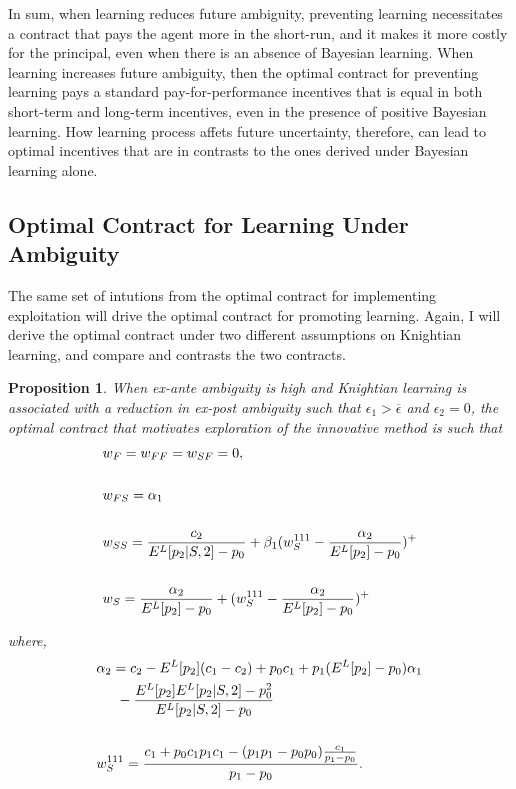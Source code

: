 \documentclass[11pt]{article} %
\theoremstyle{exampstyle}
\newtheorem{proposition}{Proposition}
\newcommand{\eq}[1]{\begin{align}#1\end{align}}
\begin{document}
In sum, when learning reduces future ambiguity, preventing learning necessitates a contract that pays the agent more in the short-run, and it makes it more costly for the principal, even when there is an absence of Bayesian learning. When learning increases future ambiguity, then the optimal contract for preventing learning pays a standard pay-for-performance incentives that is equal in both short-term and long-term incentives, even in the presence of positive Bayesian learning. How learning process affets future uncertainty, therefore, can lead to optimal incentives that are in contrasts to the ones derived under Bayesian learning alone. 


\subsection{Optimal Contract for Learning Under Ambiguity}

The same set of intutions from the optimal contract for implementing exploitation will drive the optimal contract for promoting learning. Again, I will derive the optimal contract under two different assumptions on Knightian learning, and compare and contrasts the two contracts. 

\vspace{.1in}
\begin{proposition}
\label{exploration}
When ex-ante ambiguity is high and Knightian learning is associated with a reduction in ex-post ambiguity such that $\epsilon_1 > \overline{\epsilon}$ and $\epsilon_2=0$, the optimal contract that motivates exploration of the innovative method is such that
\eq{
&w_F=w_{FF}=w_{SF} = 0, \notag \\
\notag \\
&w_{FS} =  \alpha_1 \notag \\
\notag \\
&w_{SS} =  \frac{c_2}{E^L[p_2|S,2]-p_0} +\beta_1 (w^{111}_S -\frac{\alpha_2}{E^L[p_2]-p_0} )^+ \notag \\
\notag \\
&w_S=  \frac{\alpha_2}{E^L[p_2]-p_0} + (w^{111}_S -\frac{\alpha_2}{E^L[p_2]-p_0} )^+ \notag 
}

where,
\eq{
&\alpha_2= c_2 - E^L[p_2](c_1-c_2) +p_0 c_1 + p_1 (E^L[p_2]-p_0) \alpha_1  \notag \\
& \hspace{.2in} - \frac{E^L[p_2]E^L[p_2|S,2]-p_0^2}{E^L[p_2|S,2]-p_0}  \notag  \\
\notag \\
&w^{111}_{S} = \frac{c_1 +p_0c_1 p_1 c_1 - (p_1 p_1 - p_0 p_0) \frac{c_1}{p_1-p_0} }{p_1-p_0}. \notag
}

\end{proposition}
\vspace{.1in}
\end{document}
